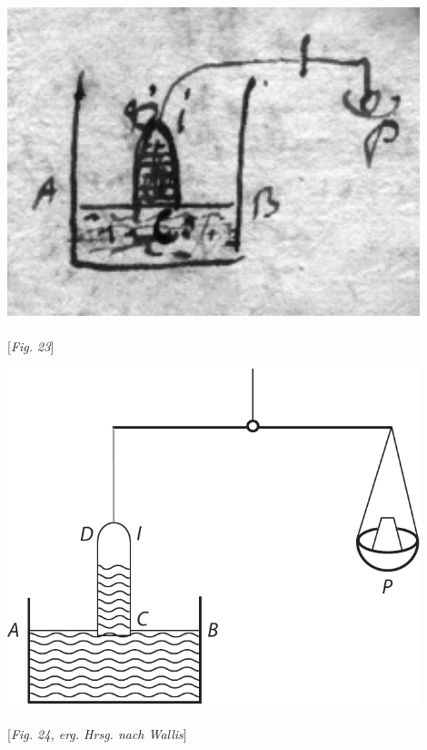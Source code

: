 \begin{minipage}[t]{0.39\textwidth}
\hspace*{-10mm}
\includegraphics[width=0.90\textwidth]{images/LH035,14,02_122v_Ausschnitt.pdf}\\
\\
\noindent\centering\hspace*{-18mm}[\textit{Fig. 23}]
\end{minipage}
\hspace*{-2mm}
\begin{minipage}[t]{0.61\textwidth}
\includegraphics[width=0.90\textwidth]{images/LH035,14,02_122v-d1.pdf}\\
\\
\noindent\centering\hspace*{-2mm}[\textit{Fig. 24, erg. Hrsg. nach Wallis}]
\vspace{1em}
\end{minipage}
